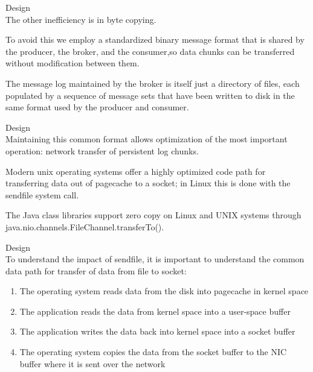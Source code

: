 \begin{frame}[plain,t]{Design} %
     \\
    \vspace{2ex}
    The other inefficiency is in byte copying.
    
    \vspace{2ex}
    To avoid this we employ a standardized binary message format that is shared by the producer, the broker, and the consumer,so data chunks can be transferred without modification between them.
    
     \vspace{2ex}
     
     The message log maintained by the broker is itself just a directory of files, each populated by a sequence of message sets that have been written to disk in the same format used by the producer and consumer. 
    
    
    
    
\end{frame}
\begin{frame}[plain,t]{Design} %
     \\
   
    \vspace{2ex}
    Maintaining this common format allows optimization of the most important operation: network transfer of persistent log chunks. 
    
    \vspace{2ex}
    Modern unix operating systems offer a highly optimized code path for transferring data out of pagecache to a socket; in Linux this is done with the sendfile system call.
    
     \vspace{2ex}
    The Java class libraries support zero copy on Linux and UNIX systems through  java.nio.channels.FileChannel.transferTo(). 
    
    
    
\end{frame}
\begin{frame}[plain,t]{Design} %
     \\
    \vspace{2ex}
    To understand the impact of sendfile, it is important to understand the common data path for transfer of data from file to socket:
    \begin{enumerate}
        \item The operating system reads data from the disk into pagecache in kernel space
        \item The application reads the data from kernel space into a user-space buffer
        \item The application writes the data back into kernel space into a socket buffer
        \item The operating system copies the data from the socket buffer to the NIC buffer where it is sent over the network
    \end{enumerate}
    
\end{frame}

